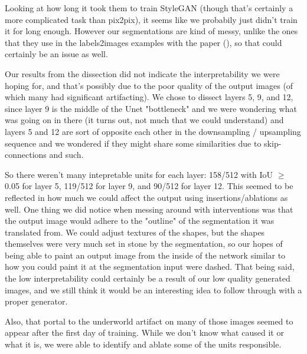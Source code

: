 \documentclass{article}
\begin{document}
Looking at how long it took them to train StyleGAN (though that's certainly a more complicated task than pix2pix), it seems like we probabily just didn't train it for long enough. However our segmentations are kind of messy, unlike the ones that they use in the  labels2images examples with the paper (\cite{pix2pix}), so that could certainly be an issue as well. 

Our results from the dissection did not indicate the interpretability we were hoping for, and that's possibly due to the poor quality of the output images (of which many had significant artifacting). We chose to dissect layers 5, 9, and 12, since layer 9 is the middle of the Unet "bottleneck" and we were wondering what was going on in there (it turns out, not much that we could understand) and layers 5 and 12 are sort of opposite each other in the downsampling / upsampling sequence and we wondered if they might share some similarities due to skip-connections and such. 


So there weren't many intepretable units for each layer: 158/512 with IoU $\geq$ 0.05 for layer 5, 119/512 for layer 9, and 90/512 for layer 12. This seemed to be reflected in how much we could affect the output using insertions/ablations as well. One thing we did notice when messing around with interventions was that the output image would adhere to the "outline" of the segmentation it was translated from. We could adjust textures of the shapes, but the shapes themselves were very much set in stone by the segmentation, so our hopes of being able to paint an output image from the inside of the network similar to how you could paint it at the segmentation input were dashed. That being said, the low interpretability could certainly be a result of our low quality generated images, and we still think it would be an interesting idea to follow through with a proper generator. 

Also, that portal to the underworld artifact on many of those images seemed to appear after the first day of training. While we don't know what caused it or what it is, we were able to identify and ablate some of the units responsible.
\end{document}
